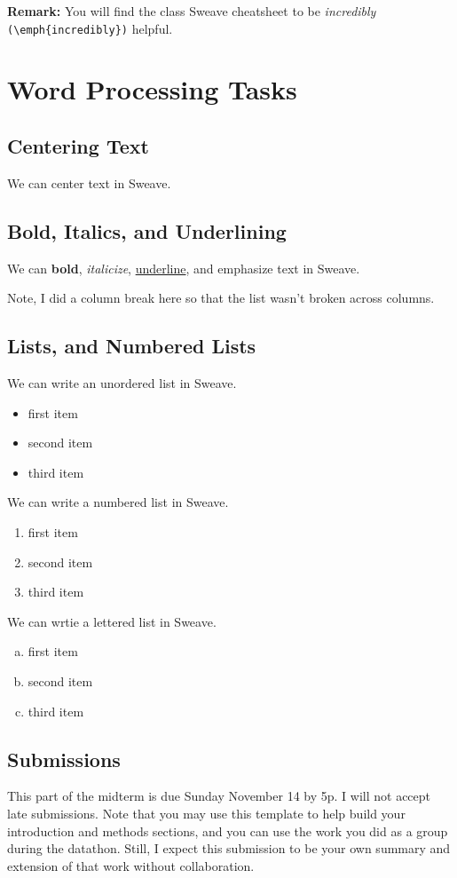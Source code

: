 \documentclass{article}\usepackage[]{graphicx}\usepackage[]{xcolor}
\begin{document}
\begin{multicols}{2}
\noindent \textbf{Remark:} You will find the class Sweave cheatsheet to be \textit{incredibly} \verb|(\emph{incredibly})| helpful.

\section{Word Processing Tasks}
\subsection{Centering Text}
\begin{center}
We can center text in Sweave.
\end{center}

\subsection{Bold, Italics, and Underlining}
We can \textbf{bold}, \textit{italicize}, \underline{underline}, and emphasize text in Sweave.

Note, I did a column break here so that the list wasn’t broken across columns. 
\columnbreak
\subsection{Lists, and Numbered Lists}
We can write an unordered list in Sweave.
\begin{itemize}\itemsep0em
\item first item
\item second item
\item third item
\end{itemize}
We can write a numbered list in Sweave.
\begin{enumerate}[1.]\itemsep0em
\item first item
\item second item
\item third item
\end{enumerate}
We can wrtie a lettered list in Sweave.
\begin{enumerate}[a.]\itemsep0em
\item first item
\item second item
\item third item
\end{enumerate}

\subsection{Submissions}
This part of the midterm is due Sunday November 14 by 5p. I will not accept late submissions. Note that you may use this template to help build your introduction and methods sections, and you can use the work you did as a group during the datathon. Still, I expect this submission to be your own summary and extension of that work without collaboration.

\end{multicols}
\end{document}
